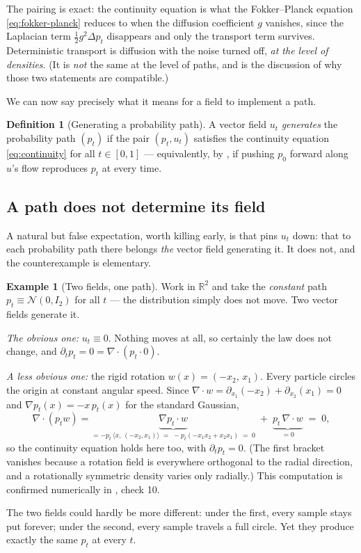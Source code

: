 \documentclass[11pt,a4paper]{report}
\theoremstyle{definition}
\newtheorem{definition}[definition]{Definition}
\newtheorem{example}[example]{Example}
\theoremstyle{remark}
\newcommand{\RR}{\mathbb R}
\begin{document}
The pairing is exact: the continuity equation is what the Fokker--Planck
equation \eqref{eq:fokker-planck} reduces to when the diffusion coefficient
$g$ vanishes, since the Laplacian term $\tfrac12g^2\Delta p_t$ disappears
and only the transport term survives. Deterministic transport is diffusion
with the noise turned off, \emph{at the level of densities}. (It is
\emph{not} the same at the level of paths, and 
is the discussion of why those two statements are compatible.)

We can now say precisely what it means for a field to implement a path.

\begin{definition}[Generating a probability path]
\label{def:generates}
A vector field $u_t$ \emph{generates} the probability path $(p_t)$ if the
pair $(p_t,u_t)$ satisfies the continuity equation \eqref{eq:continuity}
for all $t\in[0,1]$ --- equivalently, by , if pushing
$p_0$ forward along $u$'s flow reproduces $p_t$ at every time.
\end{definition}

\subsection{A path does not determine its field}
\label{sec:vf-nonuniqueness}

A natural but false expectation, worth killing early, is that
 pins $u_t$ down: that to each probability path there
belongs \emph{the} vector field generating it. It does not, and the
counterexample is elementary.

\begin{example}[Two fields, one path]
\label{ex:nonuniqueness}
Work in $\RR^2$ and take the \emph{constant} path
$p_t \equiv \mathcal N(0,I_2)$ for all $t$ --- the distribution simply does
not move. Two vector fields generate it.

\emph{The obvious one:} $u_t\equiv 0$. Nothing moves at all, so certainly
the law does not change, and $\partial_tp_t = 0 = \nabla\cdot(p_t\cdot0)$.

\emph{A less obvious one:} the rigid rotation
$w(x) = (-x_2,\,x_1)$. Every particle circles the origin at constant
angular speed. Since $\nabla\cdot w = \partial_{x_1}(-x_2)+\partial_{x_2}(x_1)=0$
and $\nabla p_t(x) = -x\,p_t(x)$ for the standard Gaussian,
\[
\nabla\cdot(p_tw)
= \underbrace{\nabla p_t\cdot w}_{=-p_t\,\langle x,\,(-x_2,x_1)\rangle\;=\;-p_t(-x_1x_2+x_2x_1)\;=\;0}
\;+\;
\underbrace{p_t\,\nabla\cdot w}_{=0}
\;=\;0 ,
\]
so the continuity equation holds here too, with $\partial_tp_t=0$. (The
first bracket vanishes because a rotation field is everywhere orthogonal to
the radial direction, and a rotationally symmetric density varies only
radially.) This computation is confirmed numerically in
, check 10.

The two fields could hardly be more different: under the first, every
sample stays put forever; under the second, every sample travels a full
circle. Yet they produce exactly the same $p_t$ at every $t$.
\end{example}
\end{document}
